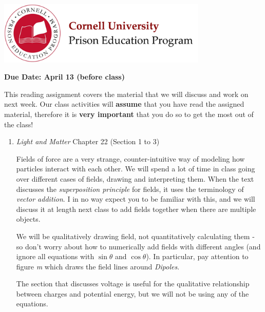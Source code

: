 \documentclass[addpoints,12pt]{exam}
\begin{document}

\begin{flushright}
\vspace{0.2in}

\end{flushright}

\begin{center}
\includegraphics[width=10cm]{../images/logo.png}
\end{center}

\begin{center}
\end{center}

\noindent\begin{large}\textbf{Due Date: April 13 (before class)}\end{large}
\vspace{0.2in}

This reading assignment covers the material that we will discuss and work on next week. Our class activities will \textbf{assume} that you have read the assigned material, therefore it is \textbf{very important} that you do so to get the most out of the class!

\begin{enumerate}


	\item \textit{Light and Matter} Chapter 22 (Section 1 to 3)
	
	Fields of force are a very strange, counter-intuitive way of modeling how particles interact with each other. We will spend a lot of time in class going over different cases of fields, drawing and interpreting them. When the text discusses the \textit{superposition principle} for fields, it uses the terminology of \textit{vector addition}. I in no way expect you to be familiar with this, and we will discuss it at length next class to add fields together when there are multiple objects.
	
	We will be qualitatively drawing field, not quantitatively calculating them - so don't worry about how to numerically add fields with different angles (and ignore all equations with $\sin\theta$ and $\cos\theta$). In particular, pay attention to figure \textit{m} which draws the field lines around \textit{Dipoles}.
	
	The section that discusses voltage is useful for the qualitative relationship between charges and potential energy, but we will not be using any of the equations.
	
\end{enumerate}
\end{document}
